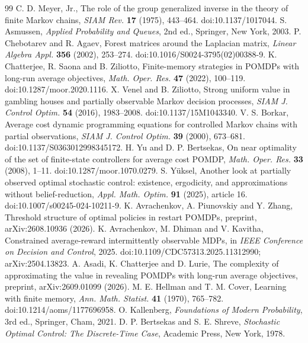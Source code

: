 \begin{thebibliography}{99}
 C. D. Meyer, Jr., The role of the group generalized inverse in the theory of finite Markov chains, \emph{SIAM Rev.} \textbf{17} (1975), 443--464. doi:10.1137/1017044.
 S. Asmussen, \emph{Applied Probability and Queues}, 2nd ed., Springer, New York, 2003.
 P. Chebotarev and R. Agaev, Forest matrices around the Laplacian matrix, \emph{Linear Algebra Appl.} \textbf{356} (2002), 253--274. doi:10.1016/S0024-3795(02)00388-9.
 K. Chatterjee, R. Saona and B. Ziliotto, Finite-memory strategies in POMDPs with long-run average objectives, \emph{Math. Oper. Res.} \textbf{47} (2022), 100--119. doi:10.1287/moor.2020.1116.
 X. Venel and B. Ziliotto, Strong uniform value in gambling houses and partially observable Markov decision processes, \emph{SIAM J. Control Optim.} \textbf{54} (2016), 1983--2008. doi:10.1137/15M1043340.
 V. S. Borkar, Average cost dynamic programming equations for controlled Markov chains with partial observations, \emph{SIAM J. Control Optim.} \textbf{39} (2000), 673--681. doi:10.1137/S0363012998345172.
 H. Yu and D. P. Bertsekas, On near optimality of the set of finite-state controllers for average cost POMDP, \emph{Math. Oper. Res.} \textbf{33} (2008), 1--11. doi:10.1287/moor.1070.0279.
 S. Y\"uksel, Another look at partially observed optimal stochastic control: existence, ergodicity, and approximations without belief-reduction, \emph{Appl. Math. Optim.} \textbf{91} (2025), article 16. doi:10.1007/s00245-024-10211-9.
 K. Avrachenkov, A. Piunovskiy and Y. Zhang, Threshold structure of optimal policies in restart POMDPs, preprint, arXiv:2608.10936 (2026).
 K. Avrachenkov, M. Dhiman and V. Kavitha, Constrained average-reward intermittently observable MDPs, in \emph{IEEE Conference on Decision and Control}, 2025. doi:10.1109/CDC57313.2025.11312990; arXiv:2504.13823.
 A. Asadi, K. Chatterjee and D. Lurie, The complexity of approximating the value in revealing POMDPs with long-run average objectives, preprint, arXiv:2609.01099 (2026).
 M. E. Hellman and T. M. Cover, Learning with finite memory, \emph{Ann. Math. Statist.} \textbf{41} (1970), 765--782. doi:10.1214/aoms/1177696958.
 O. Kallenberg, \emph{Foundations of Modern Probability}, 3rd ed., Springer, Cham, 2021.
 D. P. Bertsekas and S. E. Shreve, \emph{Stochastic Optimal Control: The Discrete-Time Case}, Academic Press, New York, 1978.
\end{thebibliography}

